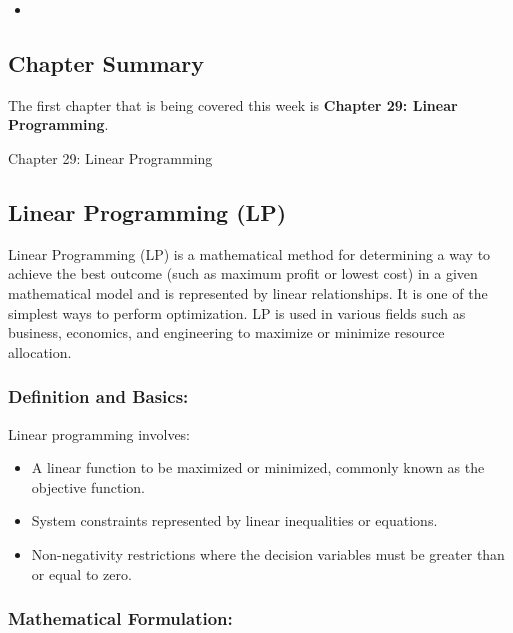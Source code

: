 \begin{itemize}
    \item {}
\end{itemize}

\subsection{Chapter Summary}

The first chapter that is being covered this week is \textbf{Chapter 29: Linear Programming}.

\begin{notes}{Chapter 29: Linear Programming}
    \subsection*{Linear Programming (LP)}

    Linear Programming (LP) is a mathematical method for determining a way to achieve the best outcome (such as maximum profit or lowest cost) in a given mathematical model and is represented by 
    linear relationships. It is one of the simplest ways to perform optimization. LP is used in various fields such as business, economics, and engineering to maximize or minimize resource allocation. \vspace*{1em}
    
    \subsubsection*{Definition and Basics:}
    
    Linear programming involves:
    \begin{itemize}
        \item A linear function to be maximized or minimized, commonly known as the objective function.
        \item System constraints represented by linear inequalities or equations.
        \item Non-negativity restrictions where the decision variables must be greater than or equal to zero.
    \end{itemize}
    
    \subsubsection*{Mathematical Formulation:}
    

\end{notes}

